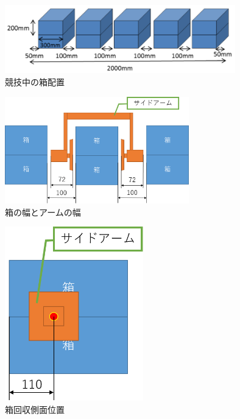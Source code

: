 \documentclass[12pt,oneside]{sotsuken_paper}
\begin{document}
		\begin{figure}[htp]
			\begin{center}
				\includegraphics[width=100mm]{Image/ブロック.png}
				\caption{競技中の箱配置}
				\label{ブロック}
			\end{center}
		\end{figure}

		\begin{figure}[htp]
			\begin{center}
				\includegraphics[width=80mm]{Image/箱回収位置寸法.png}
				\caption{箱の幅とアームの幅}
				\label{箱回収位置寸法}
			\end{center}
		\end{figure}

		\begin{figure}[htp]
			\begin{center}
				\includegraphics[width=60mm]{Image/箱回収（側面）.png}
				\caption{箱回収側面位置}
				\label{箱回収側面位置}
			\end{center}
		\end{figure}
\end{document}
